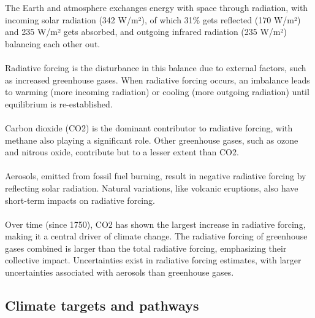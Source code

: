 \documentclass[../summary.tex]{subfiles}
\begin{document}
The Earth and atmosphere exchanges energy with space through radiation, with incoming solar radiation (342 W/m²), of which 31\% gets reflected (170 W/m²) and 235 W/m² gets absorbed, and outgoing infrared radiation (235 W/m²) balancing each other out.\\
\\
Radiative forcing is the disturbance in this balance due to external factors, such as increased greenhouse gases. When radiative forcing occurs, an imbalance leads to warming (more incoming radiation) or cooling (more outgoing radiation) until equilibrium is re-established.\\
\\
Carbon dioxide (CO2) is the dominant contributor to radiative forcing, with methane also playing a significant role. Other greenhouse gases, such as ozone and nitrous oxide, contribute but to a lesser extent than CO2.\\
\\
Aerosols, emitted from fossil fuel burning, result in negative radiative forcing by reflecting solar radiation. Natural variations, like volcanic eruptions, also have short-term impacts on radiative forcing.\\
\\
Over time (since 1750), CO2 has shown the largest increase in radiative forcing, making it a central driver of climate change. The radiative forcing of greenhouse gases combined is larger than the total radiative forcing, emphasizing their collective impact. Uncertainties exist in radiative forcing estimates, with larger uncertainties associated with aerosols than greenhouse gases.

\subsection{Climate targets and pathways}
\end{document}
